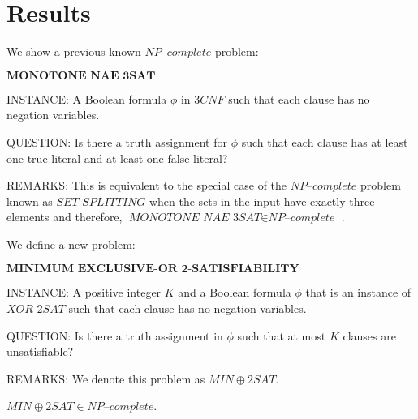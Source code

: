 \documentclass[a4paper,UKenglish,cleveref, autoref]{lipics-v2019}
\begin{document}
\section{Results}

We show a previous known $\textit{NP--complete}$ problem:

\begin{definition}
$\textbf{MONOTONE NAE 3SAT}$

INSTANCE: A Boolean formula $\phi$ in $3CNF$ such that each clause has no negation variables.

QUESTION: Is there a truth assignment for $\phi$ such that each clause has at least one true literal and at least one false literal?

REMARKS: This is equivalent to the special case of the $\textit{NP--complete}$ problem known as $\textit{SET SPLITTING}$ when the sets in the input have exactly three elements and therefore, $\textit{MONOTONE NAE 3SAT} \in \textit{NP--complete}$ \cite{GJ79}.
\end{definition}

We define a new problem:

\begin{definition}
$\textbf{MINIMUM EXCLUSIVE-OR 2-SATISFIABILITY}$

INSTANCE: A positive integer $K$ and a Boolean formula $\phi$ that is an instance of $\textit{XOR 2SAT}$ such that each clause has no negation variables.

QUESTION: Is there a truth assignment in $\phi$ such that at most $K$ clauses are unsatisfiable?

REMARKS: We denote this problem as $MIN\oplus2SAT$.
\end{definition}


\begin{theorem}
\label{completeness}
$MIN\oplus2SAT \in \textit{NP--complete}$.
\end{theorem}
\end{document}
